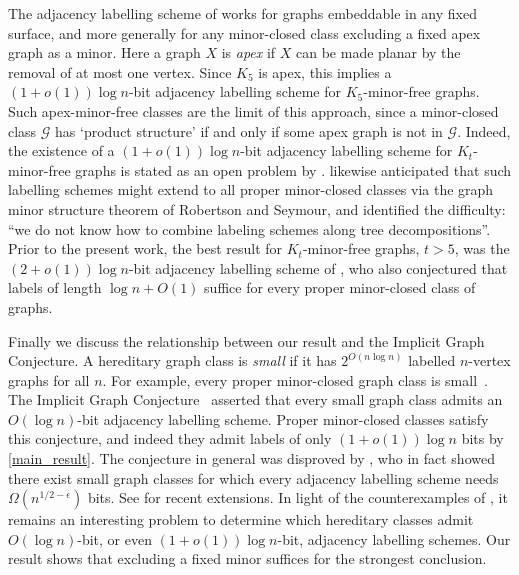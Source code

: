 \documentclass{patmorin}
\newcommand{\defin}[1]{\emph{\textcolor{brightmaroon}{#1}}}
\newcommand{\Oh}{O}
\begin{document}
The adjacency labelling scheme of \citet{dujmovic.esperet.ea:adjacency} works for  graphs embeddable in any fixed surface, and more generally for any minor-closed class excluding a fixed apex graph as a minor. Here a graph $X$ is \defin{apex} if $X$ can be made planar by the removal of at most one vertex. Since $K_5$ is apex, this implies a $(1+o(1))\log n$-bit adjacency labelling scheme for $K_5$-minor-free graphs. Such apex-minor-free classes are the limit of this approach, since a minor-closed class $\mathcal{G}$ has `product structure' if and only if some apex graph is not in $\mathcal{G}$. Indeed, the existence of a $(1+o(1))\log n$-bit adjacency labelling scheme for $K_t$-minor-free graphs is stated as an open problem by \citet[Section~6, Problem~2]{dujmovic.esperet.ea:adjacency}. \citet{BGP22} likewise anticipated that such labelling schemes might extend to all proper minor-closed classes via the graph minor structure theorem of Robertson and Seymour, and identified the difficulty: ``we do not know how to combine labeling schemes along tree decompositions''.
 Prior to the present work, the best result for $K_t$-minor-free graphs, $t > 5$, was the $(2+o(1))\log n$-bit adjacency labelling scheme of \citet{gavoille.labourel:shorter}, who also conjectured that labels of length $\log n + \Oh(1)$ suffice for
every proper minor-closed class of graphs.



Finally we discuss the relationship between our result and the Implicit Graph Conjecture. A hereditary graph class is \defin{small} if it has $2^{O(n\log n)}$ labelled $n$-vertex graphs for all $n$. For example, every proper minor-closed graph class is small~\citep{NSTW06}. The Implicit Graph Conjecture~\citep{kannan.naor.ea:implicit} asserted that every small graph class admits an $O(\log n)$-bit adjacency labelling scheme. Proper minor-closed classes satisfy this conjecture, and indeed they admit labels of only $(1+o(1))\log n$ bits by \cref{main_result}. The conjecture in general was disproved by \citet{HH22}, who in fact showed there exist small graph classes for which every adjacency labelling scheme needs $\Omega(n^{1/2-\epsilon})$ bits. See \citep{Bonnet-etal-ICALP24,Bonnet-etal-SJC24,Alon24} for recent extensions. In light of the counterexamples of \cite{HH22}, it remains an interesting problem to determine which hereditary classes admit $O(\log n)$-bit, or even $(1+o(1))\log n$-bit, adjacency labelling schemes. Our result shows that excluding a fixed minor suffices for the strongest conclusion.
\end{document}
